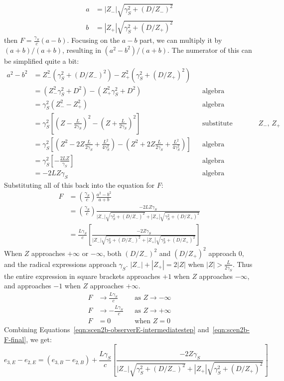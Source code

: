 \documentclass[a4paper]{article}
\theoremstyle{plain}
\theoremstyle{definition}
\begin{document}
\begin{align*}
a & = |Z_{-}| \sqrt{ \gamma_S^2 + (D/Z_{-})^2 } \\
b & = |Z_{+}| \sqrt{ \gamma_S^2 + (D/Z_{+})^2 }
\end{align*}
then $F = \frac{\gamma_S}{c} (a-b)$.  Focusing on the $a-b$ part, we
can multiply it by $(a+b)/(a+b)$, resulting in $(a^2-b^2)/(a+b)$.  The
numerator of this can be simplified quite a bit:
\begin{align*}
a^2 - b^2
  & = Z_{-}^2 ( \gamma_S^2 + (D/Z_{-})^2 ) - Z_{+}^2 ( \gamma_S^2 + (D/Z_{+})^2 ) \\
  & = ( Z_{-}^2 \gamma_S^2 + D^2 ) - (Z_{+}^2 \gamma_S^2 + D^2 ) & & \text{algebra} \\
  & = \gamma_S^2 (Z_{-}^2 - Z_{+}^2) & & \text{algebra} \\
  & = \gamma_S^2 \left[ (Z-\frac{L}{2\gamma_S})^2 - (Z+\frac{L}{2\gamma_S})^2 \right] & & \text{substitute definitinos of $Z_{-}$, $Z_{+}$} \\
  & = \gamma_S^2 \left[ (Z^2-2Z\frac{L}{2\gamma_S} + \frac{L^2}{4\gamma_S^2}) - (Z^2+2Z\frac{L}{2\gamma_S} + \frac{L^2}{4\gamma_S^2}) \right] & & \text{algebra} \\
  & = \gamma_S^2 \left[ -\frac{2LZ}{\gamma_S} \right] & & \text{algebra} \\
  & = -2LZ\gamma_S & & \text{algebra}
\end{align*}
Substituting all of this back into the equation for $F$:
\begin{align}
F
  & = (\frac{\gamma_S}{c}) \frac{a^2-b^2}{a+b} \nonumber \\
  & = (\frac{\gamma_S}{c}) \frac{-2LZ\gamma_S}{|Z_{-}| \sqrt{ \gamma_S^2 + (D/Z_{-})^2 } + |Z_{+}| \sqrt{ \gamma_S^2 + (D/Z_{+})^2 }} \nonumber \\
  & = \frac{L\gamma_S}{c} \left[ \frac{-2Z\gamma_S}{|Z_{-}| \sqrt{ \gamma_S^2 + (D/Z_{-})^2 } + |Z_{+}| \sqrt{ \gamma_S^2 + (D/Z_{+})^2 }} \right] \label{eqn:scen2b-F-final}
\end{align}
When $Z$ approaches $+\infty$ or $-\infty$,
both $(D/Z_{-})^2$ and $(D/Z_{+})^2$ approach 0,
and the radical expressions approach $\gamma_S$.
$|Z_{-}| + |Z_{+}| = 2|Z|$ when $|Z| > \frac{L}{2 \gamma_S}$.
Thus the entire expression in square brackets
approaches $+1$ when $Z$ approaches $-\infty$,
and approaches $-1$ when $Z$ approaches $+\infty$.
\begin{align*}
F & \rightarrow \frac{L\gamma_S}{c} & & \text{as $Z \rightarrow -\infty$} \\
F & \rightarrow -\frac{L\gamma_S}{c} & & \text{as $Z \rightarrow +\infty$} \\
F & = 0 & & \text{when $Z=0$}
\end{align*}
Combining Equations~\eqref{eqn:scen2b-observerE-intermediatestep}
and~\eqref{eqn:scen2b-F-final}, we get:
\begin{equation}
e_{3,E}-e_{2,E}
  = (e_{3,B}-e_{2,B}) +
  \frac{L\gamma_S}{c} \left[ \frac{-2Z\gamma_S}{|Z_{-}| \sqrt{ \gamma_S^2 + (D/Z_{-})^2 } + |Z_{+}| \sqrt{ \gamma_S^2 + (D/Z_{+})^2 }} \right] \label{appeqn:scen2b-observerE-finalstep}
\end{equation}
\end{document}

